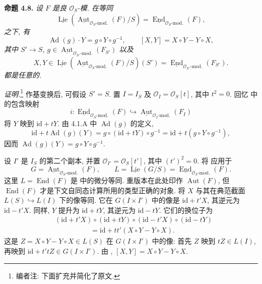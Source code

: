 \medskip
\noindent{}\textbf{命题 4.8.}
\textit{设 \(F\) 是良 \(\mathcal O_S\)-模. 在等同}
\[
 \underline{\operatorname{Lie}}\!
  \left(\underline{\operatorname{Aut}}_{\mathcal O_S\text{-mod.}}(F)/S\right)
 =
 \underline{\operatorname{End}}_{\mathcal O_S\text{-mod.}}(F),
\]
\textit{之下, 有}
\[
 \operatorname{Ad}(g)\cdot Y=g\circ Y\circ g^{-1},
 \qquad
 [X,Y]=X\circ Y-Y\circ X,
\]
\textit{其中 \(S'\to S\),
\(g\in
\underline{\operatorname{Aut}}_{\mathcal O_{S'}\text{-mod.}}(F_{S'})\)
以及}
\[
 X,Y\in
 \underline{\operatorname{Lie}}\!
  \left(\underline{\operatorname{Aut}}_{\mathcal O_S\text{-mod.}}(F)/S\right)
  (S')
 =
 \underline{\operatorname{End}}_{\mathcal O_{S'}\text{-mod.}}(F_{S'}).
\]
\textit{都是任意的.}

\textit{证明.}\footnote{编者注: 下面扩充并简化了原文.}
作基变换后, 可假设 \(S'=S\). 置 \(I=I_S\) 及
\(\mathcal O_I=\mathcal O_S[t]\), 其中 \(t^2=0\).
回忆  中的包含映射
\[
 i:\underline{\operatorname{End}}_{\mathcal O_S\text{-mod.}}(F)
 \hookrightarrow
 \underline{\operatorname{Aut}}_{\mathcal O_I\text{-mod.}}(F_I)
\]
将 \(Y\) 映到 \(\mathrm{id}+tY\). 由 4.1.A 中
\(\operatorname{Ad}(g)\) 的定义,
\[
 \mathrm{id}+t\operatorname{Ad}(g)(Y)
 =g\circ(\mathrm{id}+tY)\circ g^{-1}
 =\mathrm{id}+t(g\circ Y\circ g^{-1}),
\]
因而
\(\operatorname{Ad}(g)(Y)=g\circ Y\circ g^{-1}\).

设 \(I'\) 是 \(I_S\) 的第二个副本, 并置
\(\mathcal O_{I'}=\mathcal O_S[t']\), 其中 \((t')^2=0\).
将  应用于
\[
 G=\underline{\operatorname{Aut}}_{\mathcal O_S\text{-mod.}}(F),
 \qquad
 L=\underline{\operatorname{Lie}}(G/S)
  =\underline{\operatorname{End}}_{\mathcal O_S\text{-mod.}}(F).
\]
这里 \(L=\operatorname{End}(F)\) 是
 中的微分等同.
重版本在此处印作 \(\operatorname{Aut}(F)\), 但
\(\operatorname{End}(F)\) 才是下文自同态计算所用的类型正确的对象.
将 \(X\) 与其在典范截面 \(L(S)\hookrightarrow L(I)\) 下的像等同.
它在 \(G(I\times I')\) 中的像是 \(\mathrm{id}+t'X\),
其逆元为 \(\mathrm{id}-t'X\). 同样, \(Y\) 提升为
\(\mathrm{id}+tY\), 其逆元为 \(\mathrm{id}-tY\). 它们的换位子为
\[
\begin{aligned}
 &(\mathrm{id}+t'X)\circ(\mathrm{id}+tY)
 \circ(\mathrm{id}-t'X)\circ(\mathrm{id}-tY)\\
 &\hspace{5em}
 =\mathrm{id}+tt'(X\circ Y-Y\circ X).
\end{aligned}
\]
这是 \(Z=X\circ Y-Y\circ X\in L(S)\) 在 \(G(I\times I')\)
中的像: 首先 \(Z\) 映到 \(tZ\in L(I)\), 再映到
\(\mathrm{id}+t'tZ\in G(I\times I')\).
由 ,
\([X,Y]=X\circ Y-Y\circ X\).

